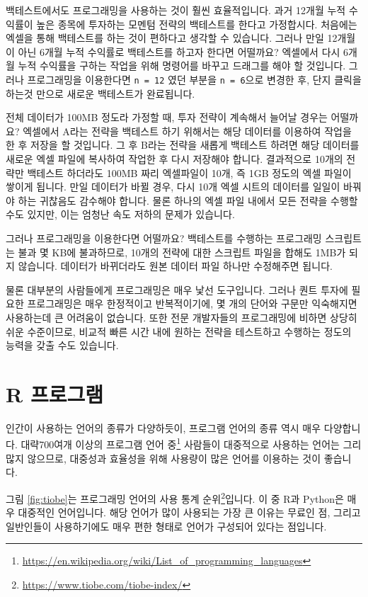 \documentclass[12pt,]{book}
\let\rmarkdownfootnote\footnote%
\def\footnote{\protect\rmarkdownfootnote}
\begin{document}
백테스트에서도 프로그래밍을 사용하는 것이 훨씬 효율적입니다. 과거 12개월 누적 수익률이 높은 종목에 투자하는 모멘텀 전략의 백테스트를 한다고 가정합시다. 처음에는 엑셀을 통해 백테스트를 하는 것이 편하다고 생각할 수 있습니다. 그러나 만일 12개월이 아닌 6개월 누적 수익률로 백테스트를 하고자 한다면 어떨까요? 엑셀에서 다시 6개월 누적 수익률을 구하는 작업을 위해 명령어를 바꾸고 드래그를 해야 할 것입니다. 그러나 프로그래밍을 이용한다면 \texttt{n\ =\ 12} 였던 부분을 \texttt{n\ =\ 6}으로 변경한 후, 단지 클릭을 하는것 만으로 새로운 백테스트가 완료됩니다.

전체 데이터가 100MB 정도라 가정할 때, 투자 전략이 계속해서 늘어날 경우는 어떨까요? 엑셀에서 A라는 전략을 백테스트 하기 위해서는 해당 데이터를 이용하여 작업을 한 후 저장을 할 것입니다. 그 후 B라는 전략을 새롭게 백테스트 하려면 해당 데이터를 새로운 엑셀 파일에 복사하여 작업한 후 다시 저장해야 합니다. 결과적으로 10개의 전략만 백테스트 하더라도 100MB 짜리 엑셀파일이 10개, 즉 1GB 정도의 엑셀 파일이 쌓이게 됩니다. 만일 데이터가 바뀔 경우, 다시 10개 엑셀 시트의 데이터를 일일이 바꿔야 하는 귀찮음도 감수해야 합니다. 물론 하나의 엑셀 파일 내에서 모든 전략을 수행할 수도 있지만, 이는 엄청난 속도 저하의 문제가 있습니다.

그러나 프로그래밍을 이용한다면 어떨까요? 백테스트를 수행하는 프로그래밍 스크립트는 불과 몇 KB에 불과하므로, 10개의 전략에 대한 스크립트 파일을 합해도 1MB가 되지 않습니다. 데이터가 바뀌더라도 원본 데이터 파일 하나만 수정해주면 됩니다.

물론 대부분의 사람들에게 프로그래밍은 매우 낯선 도구입니다. 그러나 퀀트 투자에 필요한 프로그래밍은 매우 한정적이고 반복적이기에, 몇 개의 단어와 구문만 익숙해지면 사용하는데 큰 어려움이 없습니다. 또한 전문 개발자들의 프로그래밍에 비하면 상당히 쉬운 수준이므로, 비교적 빠른 시간 내에 원하는 전략을 테스트하고 수행하는 정도의 능력을 갖출 수도 있습니다.

\hypertarget{r-}{%
\section{R 프로그램}\label{r-}}

인간이 사용하는 언어의 종류가 다양하듯이, 프로그램 언어의 종류 역시 매우 다양합니다. 대략700여개 이상의 프로그램 언어 중\footnote{\url{https://en.wikipedia.org/wiki/List_of_programming_languages}} 사람들이 대중적으로 사용하는 언어는 그리 많지 않으므로, 대중성과 효율성을 위해 사용량이 많은 언어를 이용하는 것이 좋습니다.

그림 \ref{fig:tiobe}는 프로그래밍 언어의 사용 통계 순위\footnote{\url{https://www.tiobe.com/tiobe-index/}}입니다. 이 중 R과 Python은 매우 대중적인 언어입니다. 해당 언어가 많이 사용되는 가장 큰 이유는 무료인 점, 그리고 일반인들이 사용하기에도 매우 편한 형태로 언어가 구성되어 있다는 점입니다.
\end{document}
